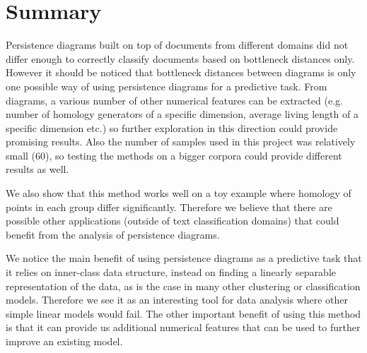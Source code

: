 \section{Summary}
\label{sec:summary}

Persistence diagrams built on top of documents from different domains did not differ enough to correctly classify documents based on bottleneck distances only. However it should be noticed that bottleneck distances between diagrams is only one possible way of using persistence diagrams for a predictive task. From diagrams, a various number of other numerical features can be extracted (e.g. number of homology generators of a specific dimension, average living length of a specific dimension etc.) so further exploration in this direction could provide promising results. Also the number of samples used in this project was relatively small (60), so testing the methods on a bigger corpora could provide different results as well.

We also show that this method works well on a toy example where homology of points in each group differ significantly. Therefore we believe that there are possible other applications (outside of text classification domains) that could benefit from the analysis of persistence diagrams.

We notice the main benefit of using persistence diagrams as a predictive task that it relies on inner-class data structure, instead on finding a linearly separable representation of the data, as is the case in many other clustering or classification models. Therefore we see it as an interesting tool for data analysis where other simple linear models would fail. The other important benefit of using this method is that it can provide us additional numerical features that can be used to further improve an existing model.
